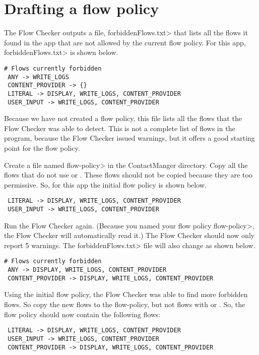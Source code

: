 \section{Drafting a flow policy}

The Flow Checker outputs a file, \<forbiddenFlows.txt> that lists all the flows
 it found in the app that are not allowed by the current flow policy.  For this app, 
 \<forbiddenFlows.txt> is shown below. 

\begin{Verbatim} 
# Flows currently forbidden
 ANY -> WRITE_LOGS 
 CONTENT_PROVIDER -> {}
 LITERAL -> DISPLAY, WRITE_LOGS, CONTENT_PROVIDER 
 USER_INPUT -> WRITE_LOGS, CONTENT_PROVIDER 
\end{Verbatim} 
Because we have not created a flow policy, this file lists all the flows that the 
Flow Checker was able to detect.  This is not a complete list of flows in the program,
because the Flow Checker issued warnings, but it offers a good starting point 
for the flow policy. 

Create a file named \<flow-policy> in the ContactManger directory.  Copy all the flows that   
do not use  or \perm{\{\}}.  These flows should not be copied because 
they are too permissive.  So, for this app the initial flow policy is shown below.
\begin{Verbatim} 
 LITERAL -> DISPLAY, WRITE_LOGS, CONTENT_PROVIDER 
 USER_INPUT -> WRITE_LOGS, CONTENT_PROVIDER 
\end{Verbatim}

 Run the Flow Checker again.  (Because you named your flow policy 
\<flow-policy>, the Flow Checker will automatically read it.)  The Flow Checker should
now only report 5 warnings.  The \<forbiddenFlows.txt> file will also change as shown
below.

\begin{Verbatim}
# Flows currently forbidden
 ANY -> DISPLAY, WRITE_LOGS, CONTENT_PROVIDER 
 CONTENT_PROVIDER -> DISPLAY, WRITE_LOGS, CONTENT_PROVIDER 
\end{Verbatim}
 
Using the initial flow policy, the Flow Checker was able to find more forbidden flows. 
So copy the new flows to the flow-policy, but not flows with  or \perm{\{\}}. 
So, the flow policy should now contain the following flows:

\begin{Verbatim} 
 LITERAL -> DISPLAY, WRITE_LOGS, CONTENT_PROVIDER 
 USER_INPUT -> WRITE_LOGS, CONTENT_PROVIDER 
 CONTENT_PROVIDER -> DISPLAY, WRITE_LOGS, CONTENT_PROVIDER 
\end{Verbatim}


